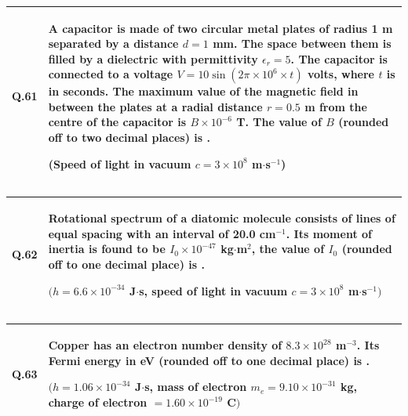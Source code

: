 \documentclass[12pt,a4paper]{article}
\begin{document}
\begin{table}[h!]
\begin{tabular}{|p{}|p{}|}
\hline
\textbf{Q.61} &
A capacitor is made of two circular metal plates of radius 1 m separated by a distance $d = 1$ mm. The space between them is filled by a dielectric with permittivity $\epsilon_r = 5$. The capacitor is connected to a voltage $V = 10\sin(2\pi \times 10^6 \times t)$ volts, where $t$ is in seconds. The maximum value of the magnetic field in between the plates at a radial distance $r = 0.5$ m from the centre of the capacitor is $B \times 10^{-6}$ T. The value of $B$ (rounded off to two decimal places) is \underline{\hspace{1.5cm}}.

\medskip
(Speed of light in vacuum $c = 3 \times 10^8$ m$\cdot$s$^{-1}$) \\
\hline
\end{tabular}
\end{table}

\bigskip

\begin{table}[h!]
\begin{tabular}{|p{}|p{}|}
\hline
\textbf{Q.62} &
Rotational spectrum of a diatomic molecule consists of lines of equal spacing with an interval of 20.0 cm$^{-1}$. Its moment of inertia is found to be $I_0 \times 10^{-47}$ kg$\cdot$m$^2$, the value of $I_0$ (rounded off to one decimal place) is \underline{\hspace{1.5cm}}.

\medskip
$(h = 6.6 \times 10^{-34}$ J$\cdot$s, speed of light in vacuum $c = 3 \times 10^8$ m$\cdot$s$^{-1})$ \\
\hline
\end{tabular}
\end{table}

\bigskip

\begin{table}[h!]
\begin{tabular}{|p{}|p{}|}
\hline
\textbf{Q.63} &
Copper has an electron number density of $8.3 \times 10^{28}$ m$^{-3}$. Its Fermi energy in eV (rounded off to one decimal place) is \underline{\hspace{1.5cm}}.

\medskip
$(h = 1.06 \times 10^{-34}$ J$\cdot$s, mass of electron $m_e = 9.10 \times 10^{-31}$ kg, charge of electron $= 1.60 \times 10^{-19}$ C$)$ \\
\hline
\end{tabular}
\end{table}
\end{document}
